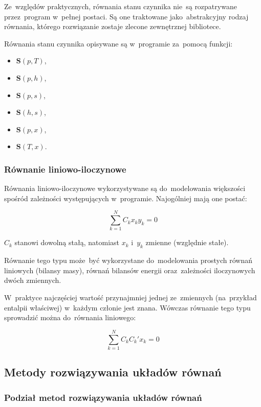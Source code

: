Ze~względów praktycznych, równania stanu czynnika nie~są rozpatrywane
przez~program w~pełnej postaci. Są one traktowane jako~abstrakcyjny
rodzaj równania, którego rozwiązanie zostaje zlecone zewnętrznej
bibliotece.

Równania stanu czynnika opisywane są w~programie za~pomocą funkcji:

\begin{itemize}
	\item $\mathbf{S}(p, T)$,
	\item $\mathbf{S}(p, h)$,
	\item $\mathbf{S}(p, s)$,
	\item $\mathbf{S}(h, s)$,
	\item $\mathbf{S}(p, x)$,
	\item $\mathbf{S}(T, x)$.
\end{itemize}


\subsubsection{Równanie liniowo-iloczynowe}

Równania liniowo-iloczynowe wykorzystywane są do~modelowania większości
spośród zależności występujących w~programie. Najogólniej mają one
postać:

\begin{equation}
	\sum_{k=1}^N C_k x_k y_k = 0
\end{equation}

$C_k$ stanowi dowolną stałą, natomiast $x_k$ i~$y_k$ zmienne (względnie
stałe).

Równanie tego typu może~być wykorzystane do~modelowania prostych równań
liniowych (bilansy masy), równań bilansów energii oraz~zależności
iloczynowych dwóch zmiennych.

W~praktyce najczęściej wartość przynajmniej jednej ze~zmiennych
(na~przykład entalpii właściwej) w~każdym członie jest znana. Wówczas
równanie tego typu sprowadzić można do~równania liniowego:

\begin{equation}
	\sum_{k=1}^N C_k C_k' x_k = 0
\end{equation}


\subsection{Metody rozwiązywania układów równań}

\subsubsection{Podział metod rozwiązywania układów równań}

